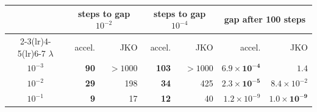 \begin{tabular}{c rr rr rr}
\toprule
 & \multicolumn{2}{c}{steps to gap $10^{-2}$} & \multicolumn{2}{c}{steps to gap $10^{-4}$} & \multicolumn{2}{c}{gap after 100 steps} \\
\cmidrule(lr){2-3}\cmidrule(lr){4-5}\cmidrule(lr){6-7}
$\lambda$ & accel. & JKO & accel. & JKO & accel. & JKO \\
\midrule
$10^{-3}$ & \textbf{90} & $>1000$ & \textbf{103} & $>1000$ & $\mathbf{6.9\times10^{-4}}$ & $1.4$ \\
$10^{-2}$ & \textbf{29} & 198 & \textbf{34} & 425 & $\mathbf{2.3\times10^{-5}}$ & $8.4\times10^{-2}$ \\
$10^{-1}$ & \textbf{9} & 17 & \textbf{12} & 40 & $1.2\times10^{-9}$ & $\mathbf{1.0\times10^{-9}}$ \\
\bottomrule
\end{tabular}
